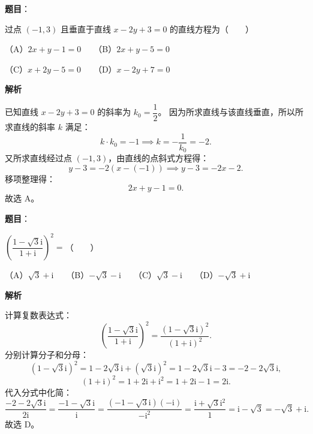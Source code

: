\begin{answer}

\textbf{题目}：

过点 $(-1,3)$ 且垂直于直线 $x-2y+3=0$ 的直线方程为\mbox{（　　）}

（A）$2x+y-1=0$　　（B）$2x+y-5=0$

（C）$x+2y-5=0$　　（D）$x-2y+7=0$

\textbf{解析}

已知直线 $x-2y+3=0$ 的斜率为 $k_0=\dfrac{1}{2}$。
因为所求直线与该直线垂直，所以所求直线的斜率 $k$ 满足：
\nopagebreak[4]
\[
k\cdot k_0=-1\implies k=-\frac{1}{k_0}=-2.
\]
又所求直线经过点 $(-1,3)$，由直线的点斜式方程得：
\nopagebreak[4]
\[
y-3=-2(x-(-1))\implies y-3=-2x-2.
\]
移项整理得：
\nopagebreak[4]
\[
2x+y-1=0.
\]
故选 A。


\end{answer}
\begin{answer}

\textbf{题目}：

$\left(\dfrac{1-\sqrt{3}\mathrm{i}}{1+\mathrm{i}}\right)^2=$\mbox{（　　）}

（A）$\sqrt{3}+\mathrm{i}$　　（B）$-\sqrt{3}-\mathrm{i}$　　（C）$\sqrt{3}-\mathrm{i}$　　（D）$-\sqrt{3}+\mathrm{i}$

\textbf{解析}

计算复数表达式：
\nopagebreak[4]
\[
\left(\frac{1-\sqrt{3}\mathrm{i}}{1+\mathrm{i}}\right)^2=\frac{(1-\sqrt{3}\mathrm{i})^2}{(1+\mathrm{i})^2}.
\]
分别计算分子和分母：
\nopagebreak[4]
\[
(1-\sqrt{3}\mathrm{i})^2=1-2\sqrt{3}\mathrm{i}+(\sqrt{3}\mathrm{i})^2=1-2\sqrt{3}\mathrm{i}-3=-2-2\sqrt{3}\mathrm{i},
\]
\nopagebreak[4]
\[
(1+\mathrm{i})^2=1+2\mathrm{i}+\mathrm{i}^2=1+2\mathrm{i}-1=2\mathrm{i}.
\]
代入分式中化简：
\nopagebreak[4]
\[
\frac{-2-2\sqrt{3}\mathrm{i}}{2\mathrm{i}}=\frac{-1-\sqrt{3}\mathrm{i}}{\mathrm{i}}=\frac{(-1-\sqrt{3}\mathrm{i})(-\mathrm{i})}{-\mathrm{i}^2}=\frac{\mathrm{i}+\sqrt{3}\mathrm{i}^2}{1}=\mathrm{i}-\sqrt{3}=-\sqrt{3}+\mathrm{i}.
\]
故选 D。


\end{answer}
